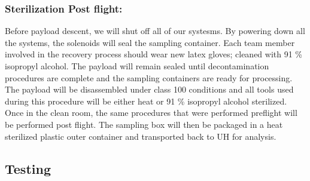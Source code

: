 \subsubsection{Sterilization Post flight:}
Before payload descent, we will shut off all of our systesms. By powering down all the systems, the solenoids will seal the sampling container. Each team member involved in the recovery process should wear new latex gloves; cleaned with 91 \% isopropyl alcohol. The payload will remain sealed until decontamination procedures are complete and the sampling containers are ready for processing. The payload will be disassembled under class 100 conditions and all tools used during this procedure will be either heat or 91 \% isopropyl alcohol sterilized. Once in the clean room, the same procedures that were performed preflight will be performed post flight. The sampling box will then be packaged in a heat sterilized plastic outer container and transported back to UH for analysis.


\subsection{Testing}

